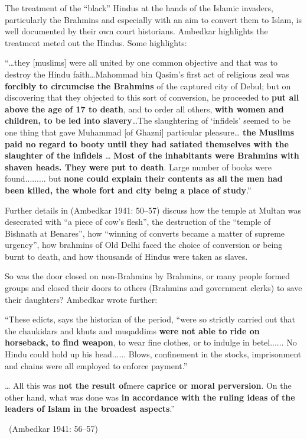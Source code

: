 The treatment of the “black” Hindus at the hands of the Islamic invaders, particularly the Brahmins and especially with an aim to convert them to Islam, is well documented by their own court historians. Ambedkar highlights the treatment meted out the Hindus. Some highlights:

\begin{myquote}
“…they [muslims] were all united by one common objective and that was to destroy the Hindu faith…Mahommad bin Qasim's first act of religious zeal was \textbf{forcibly to circumcise the Brahmins} of the captured city of Debul; but on discovering that they objected to this sort of conversion, he proceeded to \textbf{put all above the age of 17 to death}, and to order all others, \textbf{with women and children, to be led into slavery}…The slaughtering of ‘infidels’ seemed to be one thing that gave Muhammad [of Ghazni] particular pleasure… \textbf{the Muslims paid no regard to booty until they had satiated themselves with the slaughter of the infidels} … \textbf{Most of the inhabitants were Brahmins with shaven heads. They were put to death}. Large number of books were found......... but \textbf{none could explain their contents as all the men had been killed, the whole fort and city being a place of study}.”
\end{myquote}

Further details in (Ambedkar 1941: 50–57) discuss how the temple at Multan was desecrated with “a piece of cow’s flesh”, the destruction of the “temple of Bishnath at Benares”, how “winning of converts became a matter of supreme urgency”, how brahmins of Old Delhi faced the choice of conversion or being burnt to death, and how thousands of Hindus were taken as slaves.

So was the door closed on non-Brahmins by Brahmins, or many people formed groups and closed their doors to others (Brahmins and government clerks) to save their daughters? Ambedkar wrote further:

\begin{myquote}
“These edicts, says the historian of the period, “were so strictly carried out that the chaukidars and khuts and muqaddims \textbf{were not able to ride on horseback, to find weapon}, to wear fine clothes, or to indulge in betel...... No Hindu could hold up his head...... Blows, confinement in the stocks, imprisonment and chains were all employed to enforce payment.”
\end{myquote}

\begin{myquote}
… All this was \textbf{not the result of}mere \textbf{caprice or moral perversion}. On the other hand, what was done was \textbf{in accordance with the ruling ideas of the leaders of Islam in the broadest aspects}.” 

~\hfill (Ambedkar 1941: 56–57)
\end{myquote}

